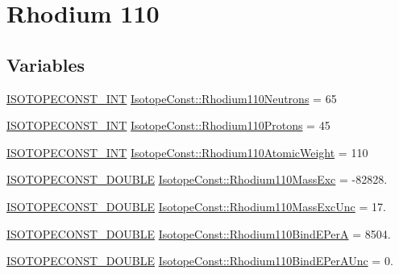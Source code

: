 \hypertarget{group___isotope_const-_rhodium-_rh110}{}\section{Rhodium 110}
\label{group___isotope_const-_rhodium-_rh110}
\subsection*{Variables}
\begin{DoxyCompactItemize}
\item 
\mbox{\hyperlink{group___isotope_const-_macros_ga5f18360b3e99483a35c32d789e62621c}{I\+S\+O\+T\+O\+P\+E\+C\+O\+N\+S\+T\+\_\+\+I\+NT}} \mbox{\hyperlink{group___isotope_const-_rhodium-_rh110_ga2565dd69231752ddf21b42c6c770a53d}{Isotope\+Const\+::\+Rhodium110\+Neutrons}} = 65
\item 
\mbox{\hyperlink{group___isotope_const-_macros_ga5f18360b3e99483a35c32d789e62621c}{I\+S\+O\+T\+O\+P\+E\+C\+O\+N\+S\+T\+\_\+\+I\+NT}} \mbox{\hyperlink{group___isotope_const-_rhodium-_rh110_ga1d87e00c9d99240a7e277c7756ff5caa}{Isotope\+Const\+::\+Rhodium110\+Protons}} = 45
\item 
\mbox{\hyperlink{group___isotope_const-_macros_ga5f18360b3e99483a35c32d789e62621c}{I\+S\+O\+T\+O\+P\+E\+C\+O\+N\+S\+T\+\_\+\+I\+NT}} \mbox{\hyperlink{group___isotope_const-_rhodium-_rh110_ga303be1c8c6821c0a1e7cf650a5929255}{Isotope\+Const\+::\+Rhodium110\+Atomic\+Weight}} = 110
\item 
\mbox{\hyperlink{group___isotope_const-_macros_ga8f45a7272ce02c0b4c65c44636ed719a}{I\+S\+O\+T\+O\+P\+E\+C\+O\+N\+S\+T\+\_\+\+D\+O\+U\+B\+LE}} \mbox{\hyperlink{group___isotope_const-_rhodium-_rh110_ga0cd8e9c668970f4a0f5ec7d2d4f4f053}{Isotope\+Const\+::\+Rhodium110\+Mass\+Exc}} = -\/82828.
\item 
\mbox{\hyperlink{group___isotope_const-_macros_ga8f45a7272ce02c0b4c65c44636ed719a}{I\+S\+O\+T\+O\+P\+E\+C\+O\+N\+S\+T\+\_\+\+D\+O\+U\+B\+LE}} \mbox{\hyperlink{group___isotope_const-_rhodium-_rh110_ga7dea6c002be6ac709b7c531b7c5a6ac6}{Isotope\+Const\+::\+Rhodium110\+Mass\+Exc\+Unc}} = 17.
\item 
\mbox{\hyperlink{group___isotope_const-_macros_ga8f45a7272ce02c0b4c65c44636ed719a}{I\+S\+O\+T\+O\+P\+E\+C\+O\+N\+S\+T\+\_\+\+D\+O\+U\+B\+LE}} \mbox{\hyperlink{group___isotope_const-_rhodium-_rh110_ga73927c2f63bee6bb5e1268588b068079}{Isotope\+Const\+::\+Rhodium110\+Bind\+E\+PerA}} = 8504.
\item 
\mbox{\hyperlink{group___isotope_const-_macros_ga8f45a7272ce02c0b4c65c44636ed719a}{I\+S\+O\+T\+O\+P\+E\+C\+O\+N\+S\+T\+\_\+\+D\+O\+U\+B\+LE}} \mbox{\hyperlink{group___isotope_const-_rhodium-_rh110_ga101e8dadc0aca4c72e98ecd398ca6d71}{Isotope\+Const\+::\+Rhodium110\+Bind\+E\+Per\+A\+Unc}} = 0.

\end{DoxyCompactItemize}
